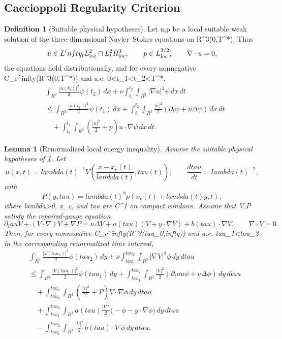 \documentclass[11pt]{amsart}
\def\({}%
\def\){}%
\def\mathbb#1{#1}%
\def\tau{tau}%
\def\lambda{lambda}%
\def\infty{infty}%
\theoremstyle{plain}
\newtheorem{lemma}[lemma]{Lemma}
\theoremstyle{definition}
\newtheorem{definition}[definition]{Definition}
\theoremstyle{remark}
\begin{document}
\subsection{Caccioppoli Regularity Criterion}

\begin{definition}[Suitable physical hypotheses]\label{paper6a:def:suitable-physical-hypotheses}
Let \(u,p\) be a local suitable weak solution of the three-dimensional
Navier--Stokes equations on \(\mathbb R^3\times(0,T^*)\).  Thus
\[
  u\in L^\infty_tL^2_{\rm loc}\cap L^2_tH^1_{\rm loc},
  \qquad
  p\in L^{3/2}_{\rm loc},
  \qquad \nabla\cdot u=0,
\]
the equations hold distributionally, and for every nonnegative
\(\psi\in C_c^\infty(\mathbb R^3\times(0,T^*))\) and a.e.
\(0<t_1<t_2<T^*\),
\[
\begin{aligned}
&\int_{\mathbb R^3}\frac{|u(t_2)|^2}{2}\psi(t_2)\,dx
+\nu\int_{t_1}^{t_2}\int_{\mathbb R^3}|\nabla u|^2\psi\,dx\,dt \\
&\le
\int_{\mathbb R^3}\frac{|u(t_1)|^2}{2}\psi(t_1)\,dx
+\int_{t_1}^{t_2}\int_{\mathbb R^3}
\frac{|u|^2}{2}(\partial_t\psi+\nu\Delta\psi)\,dx\,dt\\
&\quad
+\int_{t_1}^{t_2}\int_{\mathbb R^3}
\left(\frac{|u|^2}{2}+p\right)u\cdot\nabla\psi\,dx\,dt .
\end{aligned}
\]
\end{definition}

\begin{lemma}[Renormalized local energy inequality]\label{paper6a:lem:renormalized-lei}
Assume the suitable physical hypotheses of
\cref{paper6a:def:suitable-physical-hypotheses}.  Let
\[
  u(x,t)=\lambda(t)^{-1}
  V\left(\frac{x-x_c(t)}{\lambda(t)},\tau(t)\right),
  \qquad
  \frac{d\tau}{dt}=\lambda(t)^{-2},
\]
with
\[
  P(y,\tau)=\lambda(t)^2p(x_c(t)+\lambda(t)y,t),
\]
where \(\lambda>0\), \(x_c\), and \(\tau\) are \(C^1\) on compact windows.
Assume that \(V,P\) satisfy the repaired-gauge equation
\[
  \partial_\tau V+(V\cdot\nabla)V+\nabla P
  =
  \nu\Delta V+a(\tau)(V+y\cdot\nabla V)+b(\tau)\cdot\nabla V,
  \qquad \nabla\cdot V=0 .
\]
Then, for every nonnegative
\(\phi\in C_c^\infty(\mathbb R^3\times(\tau_0,\infty))\) and a.e.
\(\tau_1<\tau_2\) in the corresponding renormalized time interval,
\[
\begin{aligned}
&\int_{\mathbb R^3}\frac{|V(\tau_2)|^2}{2}\phi(\tau_2)\,dy
+\nu\int_{\tau_1}^{\tau_2}\int_{\mathbb R^3}|\nabla V|^2\phi\,dy\,d\tau \\
&\le
\int_{\mathbb R^3}\frac{|V(\tau_1)|^2}{2}\phi(\tau_1)\,dy
+\int_{\tau_1}^{\tau_2}\int_{\mathbb R^3}
\frac{|V|^2}{2}(\partial_\tau\phi+\nu\Delta\phi)\,dy\,d\tau\\
&\quad
+\int_{\tau_1}^{\tau_2}\int_{\mathbb R^3}
\left(\frac{|V|^2}{2}+P\right)V\cdot\nabla\phi\,dy\,d\tau\\
&\quad
+\int_{\tau_1}^{\tau_2}\int_{\mathbb R^3}
a(\tau)\frac{|V|^2}{2}\bigl(-\phi-y\cdot\nabla\phi\bigr)\,dy\,d\tau\\
&\quad
-\int_{\tau_1}^{\tau_2}\int_{\mathbb R^3}
\frac{|V|^2}{2}\,b(\tau)\cdot\nabla\phi\,dy\,d\tau .
\end{aligned}
\]
\end{lemma}
\end{document}
